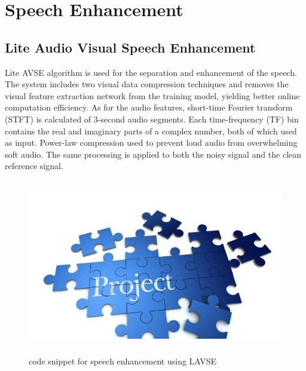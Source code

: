 \documentclass[12pt,a4paper]{report}
\begin{document}
\section{Speech Enhancement}
\subsection{Lite Audio Visual Speech Enhancement}
\par
Lite AVSE algorithm is used for the separation and enhancement of the speech. The system 
includes two visual data compression techniques and removes the visual feature extraction 
network from the training model, yielding better online computation efficiency. As for the audio 
features, short-time Fourier transform (STFT) is calculated of 3-second audio segments. Each 
time-frequency (TF) bin contains the real and imaginary parts of a complex number, both of 
which used as input. Power-law compression used to prevent loud audio from overwhelming soft 
audio. The same processing is applied to both the noisy signal and the clean reference signal.

\begin{figure}[hbtp]
\centering
\includegraphics[width=5in,height=3in]{./pic/sample.jpg}
\caption{code snippet for speech enhancement using LAVSE}
\end{figure}
\end{document}
